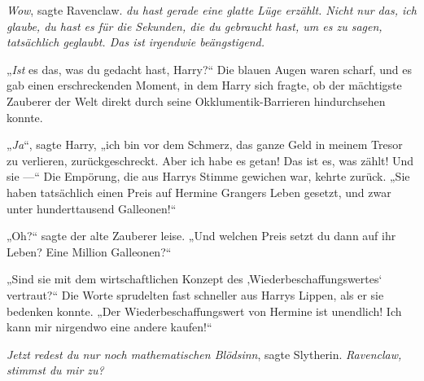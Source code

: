 \emph{Wow}, sagte Ravenclaw. \emph{du hast gerade eine glatte Lüge erzählt. Nicht nur das, ich glaube, du hast es für die Sekunden, die du gebraucht hast, um es zu sagen, tatsächlich geglaubt. Das ist irgendwie beängstigend.}

„\emph{Ist} es das, was du gedacht hast, Harry?“
Die blauen Augen waren scharf, und es gab einen erschreckenden Moment, in dem Harry sich fragte, ob der mächtigste Zauberer der Welt direkt durch seine Okklumentik-Barrieren hindurchsehen konnte.

„\emph{Ja}“, sagte Harry, „ich bin vor dem Schmerz, das ganze Geld in meinem Tresor zu verlieren, zurückgeschreckt. Aber ich habe es getan! Das ist es, was zählt! Und sie —“
Die Empörung, die aus Harrys Stimme gewichen war, kehrte zurück.
„Sie haben tatsächlich einen Preis auf Hermine Grangers Leben gesetzt, und zwar unter hunderttausend Galleonen!“

„Oh?“ sagte der alte Zauberer leise.
„Und welchen Preis setzt du dann auf ihr Leben? Eine Million Galleonen?“

„Sind sie mit dem wirtschaftlichen Konzept des ‚Wiederbeschaffungswertes‘ vertraut?“ Die Worte sprudelten fast schneller aus Harrys Lippen, als er sie bedenken konnte.
„Der Wiederbeschaffungswert von Hermine ist unendlich! Ich kann mir nirgendwo eine andere kaufen!“

\emph{Jetzt redest du nur noch mathematischen Blödsinn}, sagte Slytherin. \emph{Ravenclaw, stimmst du mir zu?}

